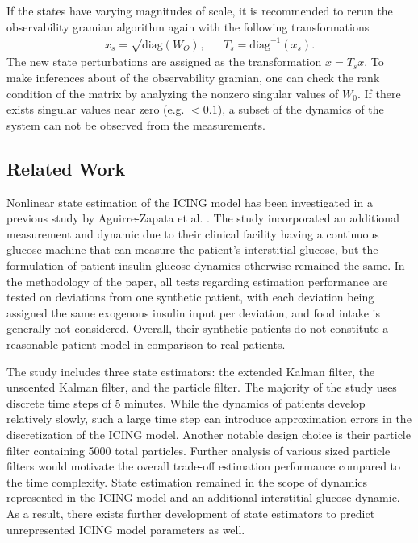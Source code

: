 \documentclass[nomenclature, english, bibtex]{kththesis}
\begin{document}
If the states have varying magnitudes of scale, it is recommended \cite{eberle_identifiability_2012} to rerun the observability gramian algorithm again with the following transformations
\begin{align}
x_s = \sqrt{\mathrm{diag}(W_O)}, && T_s = \mathrm{diag}^{-1}(x_s).
\end{align}
The new state perturbations are assigned as the transformation $\bar{x} = T_s x$. 
To make inferences about of the observability gramian, one can check the rank condition of the matrix by analyzing the nonzero singular values of $W_0$. If there exists singular values near zero (e.g. $<0.1$), a subset of the dynamics of the system can not be observed from the measurements.

\subsection{Related Work}
Nonlinear state estimation of the \gls{ICING} model has been investigated in a previous study by Aguirre-Zapata et al. \cite{aguirre-zapata_glycemic_2017}. The study incorporated an additional measurement and dynamic due to their clinical facility having a continuous glucose machine that can measure the patient's interstitial glucose, but the formulation of patient insulin-glucose dynamics otherwise remained the same. In the methodology of the paper, all tests regarding estimation performance are tested on deviations from one synthetic patient, with each deviation being assigned the same exogenous insulin input per deviation, and food intake is generally not considered. Overall, their synthetic patients do not constitute a reasonable patient model in comparison to real patients.

The study includes three state estimators: the extended Kalman filter, the unscented Kalman filter, and the particle filter. The majority of the study uses discrete time steps of 5 minutes. While the dynamics of patients develop relatively slowly, such a large time step can introduce approximation errors in the discretization of the ICING model. Another notable design choice is their particle filter containing 5000 total particles. Further analysis of various sized particle filters would motivate the overall trade-off estimation performance compared to the time complexity. State estimation remained in the scope of dynamics represented in the \gls{ICING} model and an additional interstitial glucose dynamic. As a result, there exists further development of state estimators to predict unrepresented \gls{ICING} model parameters as well.
\end{document}
